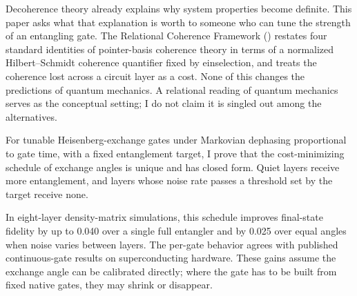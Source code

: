 
Decoherence theory already explains why system properties become
definite. This paper asks what that explanation is worth to someone who
can tune the strength of an entangling gate. The Relational Coherence
Framework (\RCF) restates four standard identities of pointer-basis
coherence theory in terms of a normalized Hilbert--Schmidt coherence
quantifier fixed by einselection, and treats the coherence lost across
a circuit layer as a cost. None of this changes the predictions of
quantum mechanics. A relational reading of quantum mechanics serves as
the conceptual setting; I do not claim it is singled out among the
alternatives.

For tunable Heisenberg-exchange gates under Markovian dephasing
proportional to gate time, with a fixed entanglement target, I prove
that the cost-minimizing schedule of exchange angles is unique and has
closed form. Quiet layers receive more entanglement, and layers whose
noise rate passes a threshold set by the target receive none.

In eight-layer density-matrix simulations, this schedule improves
final-state fidelity by up to 0.040 over a single full entangler and by
0.025 over equal angles when noise varies between layers. The per-gate
behavior agrees with published continuous-gate results on
superconducting hardware. These gains assume the exchange angle can be
calibrated directly; where the gate has to be built from fixed native
gates, they may shrink or disappear.
